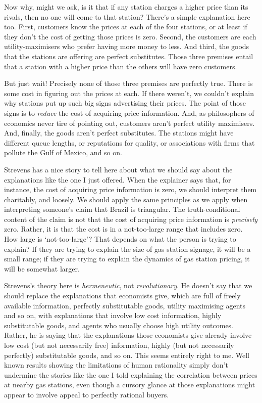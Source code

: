 \documentclass[
  11pt,
  letterpaper,
  DIV=11,
  numbers=noendperiod,
  oneside]{scrartcl}
\begin{document}
Now why, might we ask, is it that if any station charges a higher price
than its rivals, then no one will come to that station? There's a simple
explanation here too. First, customers know the prices at each of the
four stations, or at least if they don't the cost of getting those
prices is zero. Second, the customers are each utility-maximisers who
prefer having more money to less. And third, the goods that the stations
are offering are perfect substitutes. Those three premises entail that a
station with a higher price than the others will have zero customers.

But just wait! Precisely none of those three premises are perfectly
true. There is some cost in figuring out the prices at each. If there
weren't, we couldn't explain why stations put up such big signs
advertising their prices. The point of those signs is to \emph{reduce}
the cost of acquiring price information. And, as philosophers of
economics never tire of pointing out, customers aren't perfect utility
maximisers. And, finally, the goods aren't perfect substitutes. The
stations might have different queue lengths, or reputations for quality,
or associations with firms that pollute the Gulf of Mexico, and so
on.

Strevens has a nice story to tell here about what we should say about
the explanations like the one I just offered. When the explainer says
that, for instance, the cost of acquiring price information is zero, we
should interpret them charitably, and loosely. We should apply the same
principles as we apply when interpreting someone's claim that Brazil is
triangular. The truth-conditional content of the claim is not that the
cost of acquiring price information is \emph{precisely} zero. Rather, it
is that the cost is in a not-too-large range that includes zero. How
large is `not-too-large'? That depends on what the person is trying to
explain? If they are trying to explain the size of gas station signage,
it will be a small range; if they are trying to explain the dynamics of
gas station pricing, it will be somewhat larger.

Strevens's theory here is \emph{hermeneutic}, not \emph{revolutionary}.
He doesn't say that we should replace the explanations that economists
give, which are full of freely available information, perfectly
substitutable goods, utility maximising agents and so on, with
explanations that involve low cost information, highly substitutable
goods, and agents who usually choose high utility outcomes. Rather, he
is saying that the explanations those economists give already involve
low cost (but not necessarily free) information, highly (but not
necessarily perfectly) substitutable goods, and so on. This seems
entirely right to me. Well known results showing the limitations of
human rationality simply don't undermine the stories like the one I told
explaining the correlation between prices at nearby gas stations, even
though a cursory glance at those explanations might appear to involve
appeal to perfectly rational buyers.
\end{document}
